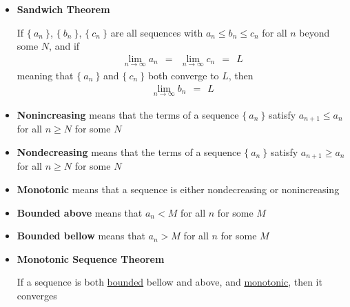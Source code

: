 \documentclass{article}
\begin{document}
\begin{itemize}
\item
\textbf{Sandwich Theorem}

If $\{~ a_n ~\}$, $\{~ b_n ~\}$, $\{~ c_n ~\}$ are all sequences with $a_n \leq b_n \leq c_n$
for all $n$ beyond some $N$, and if
\begin{gather*}
\lim_{n \to \infty} a_n
~~=~~
\lim_{n \to \infty} c_n
~~=~~ L
\end{gather*}
meaning that $\{~ a_n ~\}$ and $\{~ c_n ~\}$ both converge to $L$, then
\begin{gather*}
\lim_{n \to \infty} b_n
~~=~~ L
\end{gather*}

\item
\textbf{Nonincreasing}
means that the terms of a sequence $\{~ a_n ~\}$ satisfy $a_{n+1} \leq a_n$
for all $n \geq N$ for some $N$

\item
\textbf{Nondecreasing}
means that the terms of a sequence $\{~ a_n ~\}$ satisfy $a_{n+1} \geq a_n$
for all $n \geq N$ for some $N$

\item
\textbf{Monotonic}
means that a sequence is either nondecreasing or nonincreasing

\item
\textbf{Bounded above}
means that $a_n<M$ for all $n$ for some $M$

\item
\textbf{Bounded bellow}
means that $a_n>M$ for all $n$ for some $M$

\item
\textbf{Monotonic Sequence Theorem}

If a sequence is both \underline{bounded} bellow and above, and \underline{monotonic},
then it converges

\end{itemize}
\end{document}
